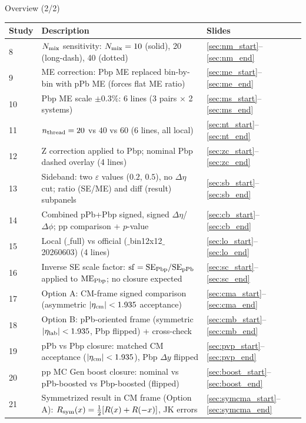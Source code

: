 \documentclass[aspectratio=169]{beamer}
\begin{document}
\begin{frame}[t]{Overview (2/2)}
  \small\vspace{0.5em}
  \begin{tabular}{lll}
    \hline
    Study & Description & Slides \\
    \hline
    8 & $N_{\rm mix}$ sensitivity: $N_{\rm mix}=10$ (solid), 20 (long-dash), 40 (dotted) & \ref{sec:nm_start}--\ref{sec:nm_end} \\
    9 & ME correction: Pbp ME replaced bin-by-bin with pPb ME (forces flat ME ratio) & \ref{sec:me_start}--\ref{sec:me_end} \\
    10 & Pbp ME scale $\pm 0.3\%$: 6 lines (3 pairs $\times$ 2 systems) & \ref{sec:ms_start}--\ref{sec:ms_end} \\
    11 & $n_{\rm thread}=20$ vs $40$ vs $60$ (6 lines, all local) & \ref{sec:nt_start}--\ref{sec:nt_end} \\
    12 & Z correction applied to Pbp; nominal Pbp dashed overlay (4 lines) & \ref{sec:zc_start}--\ref{sec:zc_end} \\
    13 & Sideband: two $\varepsilon$ values ($0.2$, $0.5$), no $\Delta\eta$ cut; ratio (SE/ME) and diff (result) subpanels & \ref{sec:sb_start}--\ref{sec:sb_end} \\
    14 & Combined pPb+Pbp signed, signed $\Delta\eta$/$\Delta\phi$; pp comparison + $p$-value & \ref{sec:cb_start}--\ref{sec:cb_end} \\
    15 & Local ($\_$full) vs official ($\_$bin12x12$\_$20260603) (4 lines) & \ref{sec:lo_start}--\ref{sec:lo_end} \\
    16 & Inverse SE scale factor: $\mathrm{sf}=\mathrm{SE}_{\rm Pbp}/\mathrm{SE}_{\rm pPb}$ applied to $\mathrm{ME}_{\rm Pbp}$; no closure expected & \ref{sec:sc_start}--\ref{sec:sc_end} \\
    17 & Option A: CM-frame signed comparison (asymmetric $|\eta_{\rm cm}|<1.935$ acceptance) & \ref{sec:cma_start}--\ref{sec:cma_end} \\
    18 & Option B: pPb-oriented frame (symmetric $|\eta_{\rm lab}|<1.935$, Pbp flipped) + cross-check & \ref{sec:cmb_start}--\ref{sec:cmb_end} \\
    19 & pPb vs Pbp closure: matched CM acceptance ($|\eta_{\rm cm}|<1.935$), Pbp $\Delta y$ flipped & \ref{sec:pvp_start}--\ref{sec:pvp_end} \\
    20 & pp MC Gen boost closure: nominal vs pPb-boosted vs Pbp-boosted (flipped) & \ref{sec:boost_start}--\ref{sec:boost_end} \\
    21 & Symmetrized result in CM frame (Option A): $R_{\rm sym}(x)=\tfrac{1}{2}[R(x)+R(-x)]$, JK errors & \ref{sec:symcma_start}--\ref{sec:symcma_end} \\
    \hline
  \end{tabular}
\end{frame}
\end{document}
